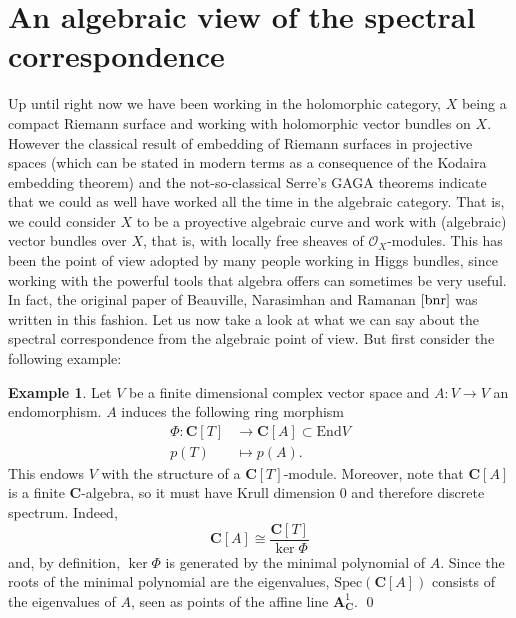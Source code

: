 \documentclass[12pt,a4paper]{book}
\theoremstyle{definition} \newtheorem{defn}[thm]{Definition}
\theoremstyle{definition} \newtheorem{ejemplo}[thm]{Example}
\theoremstyle{remark} \newtheorem{rem}[thm]{Remark}
\def\OO{\mathscr{O}}
\def\CC{\mathbf{C}}
\def\End{\mathrm{End}}
\def\Spec{\mathrm{Spec}}
\begin{document}
	      \section{An algebraic view of the spectral correspondence}
	      Up until right now we have been working in the holomorphic category, $X$ being a compact Riemann surface and working with holomorphic vector bundles on $X$. However the classical result of embedding of Riemann surfaces in projective spaces (which can be stated in modern terms as a consequence of the Kodaira embedding theorem) and the not-so-classical Serre's GAGA theorems indicate that we could as well have worked all the time in the algebraic category. That is, we could consider $X$ to be a proyective algebraic curve and work with (algebraic) vector bundles over $X$, that is, with locally free sheaves of $\OO_X$-modules. This has been the point of view adopted by many people working in Higgs bundles, since working with the powerful tools that algebra offers can sometimes be very useful. In fact, the original paper of Beauville, Narasimhan and Ramanan $\cite{bnr}$ was written in this fashion. Let us now take a look at what we can say about the spectral correspondence from the algebraic point of view. But first consider the following example:
	      \begin{ejemplo}
		Let $V$ be a finite dimensional complex vector space and $A:V\rightarrow V$ an endomorphism. $A$ induces the following ring morphism
		\begin{align*}
		  \Phi :\CC[T]&\longrightarrow \CC[A]\subset \End V\\ 
		    p(T) &\longmapsto p(A). 
		  \end{align*}
		  This endows $V$ with the structure of a $\CC[T]$-module. Moreover, note that $\CC[A]$ is a finite $\CC$-algebra, so it must have Krull dimension $0$ and therefore discrete spectrum. Indeed, 
		  \begin{equation*}
		    \CC[A] \cong \frac{\CC[T]}{\ker \Phi}
		  \end{equation*}
		  and, by definition, $\ker \Phi$ is generated by the minimal polynomial of $A$. Since the roots of the minimal polynomial are the eigenvalues, $\Spec(\CC[A])$ consists of the eigenvalues of $A$, seen as points of the affine line $\mathbf{A}^1_\CC$.
		\qed
	      \end{ejemplo}
\end{document}
